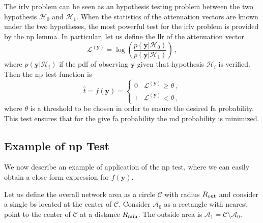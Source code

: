 \documentclass[conference]{IEEEtran}
\begin{document}
The \ac{irlv} problem can be seen as an hypothesis testing problem between the two hypothesis $\mathcal H_0$ and $\mathcal H_1$. When the statistics of the attenuation vectors are known under the two hypotheses, the most powerful test for the \ac{irlv} problem is provided by the \ac{np} lemma. In particular, let us  define the \ac{llr} of the attenuation vector
\begin{equation}\label{eq:lr}
    \mathcal{L}^{(\bm{y})}=\log\left(\frac{p(\bm{y}|\mathcal{H}_0)}{p(\bm{y}|\mathcal{H}_1)}\right)\,,
\end{equation}
where $p(\bm{y}|\mathcal{H}_i)$ if the \ac{pdf} of observing $\bm{y}$ given that hypothesis $\mathcal H_i$ is verified. Then the \ac{np} test function is 
\begin{equation}
    \hat{t} = f(\bm{y}) = \begin{cases}
    0 & \mathcal{L}^{(\bm{y})} \geq \theta\,, \\ 
    1 & \mathcal{L}^{(\bm{y})} < \theta\,, 
    \end{cases}
\end{equation}
where $\theta$ is a threshold to be chosen in order to ensure the desired \ac{fa} probability. This test ensures that for the give \ac{fa} probability the \ac{md} probability is minimized. 

\subsection{Example of \ac{np} Test}
\label{sec:los}
We now describe an example of application of the \ac{np} test, where we can easily obtain a close-form expression for $f(\bm{y})$. 

Let us define the overall network area as a circle $\mathcal{C}$ with radius $R_{\rm out}$ and consider a single \ac{bs} located at the center of $\mathcal{C}$. Consider $\mathcal{A}_{0}$ as a rectangle with nearest point to the center of $\mathcal{C}$ at a distance $R_{\rm min}$. The outside area is $\mathcal{A}_1 = \mathcal{C} \setminus \mathcal{A}_0$.
\end{document}
